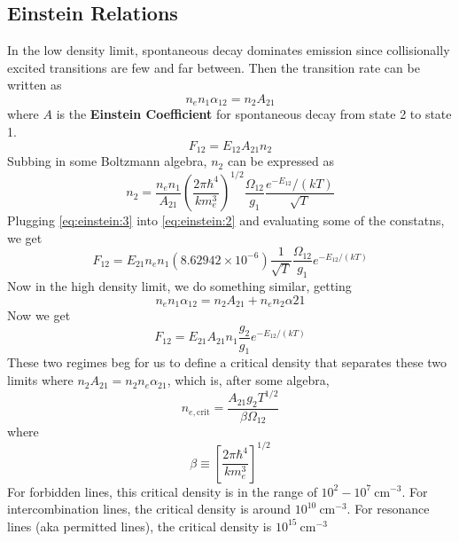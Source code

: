 \documentclass[10pt]{article}
\numberwithin{equation}{section}
\begin{document}
\subsection{Einstein Relations} %
\label{sub:einstein_relations}
In the low density limit, spontaneous decay dominates emission since collisionally excited transitions are few and far between. Then the transition rate can be written as
\begin{equation}
  \label{eq:einstein:1} n_en_1\alpha_{12} = n_2 A_{21}
\end{equation}
where $A$ is the \textbf{Einstein Coefficient} for spontaneous decay from state 2 to state 1. 
\begin{equation}
  \label{eq:einstein:2} F_{12} = E_{12} A_{21} n_2
\end{equation}
Subbing in some Boltzmann algebra, $n_2$ can be expressed as
\begin{equation}
  \label{eq:einstein:3} n_2 = \frac{n_en_1}{A_{21}} \left( \frac{2\pi \hbar^4} {k m_e^3}\right)^{1/2} \frac{\Omega_{12}}{g_1} \frac{e^{-E_12}/(kT)}{\sqrt{T}}
\end{equation}
Plugging \eqref{eq:einstein:3} into \eqref{eq:einstein:2} and evaluating some of the constatns, we get
\begin{equation}
  \label{eq:einstein:4} F_{12} = E_{21} n_e n_1 \left(8.62942\times 10^{-6}\right) \frac{1}{\sqrt{T}} \frac{\Omega_{12}}{g_1}e^{-E_{12}/(kT)}
\end{equation}
Now in the high density limit, we do something similar, getting
\begin{equation}
  \label{eq:einstein:5} n_e n_1 \alpha_{12} = n_2 A_{21} + n_e n_2 \alpha{21}
\end{equation}
Now we get
\begin{equation}
  \label{eq:einstein:6} F_{12} = E_{21} A_{21} n_1 \frac{g_2}{g_1} e^{-E_{12} / (kT)}
\end{equation}
These two regimes beg for us to define a critical density that separates these two limits where $n_2A_{21} = n_2n_e \alpha_{21}$, which is, after some algebra,
\begin{equation}
  \label{eq:einstein:7} \boxed{n_{e, \mathrm{crit}} = \frac{A_{21}g_2 T^{1/2}} {\beta \Omega_{12}}}
\end{equation}
where 
\begin{equation}
  \label{eq:einstein:8} \beta \equiv \left[\frac{2\pi \hbar^4}{k m_e^3}\right]^{1/2}
\end{equation}
For forbidden lines, this critical density is in the range of $10^2-10^7\ \mathrm{cm^{-3}}$. For intercombination lines, the critical density is around $10^10\ \mathrm{cm^{-3}}$. For resonance lines (aka permitted lines), the critical density is $10^{15}\ \mathrm{cm^{-3}}$
\end{document}
